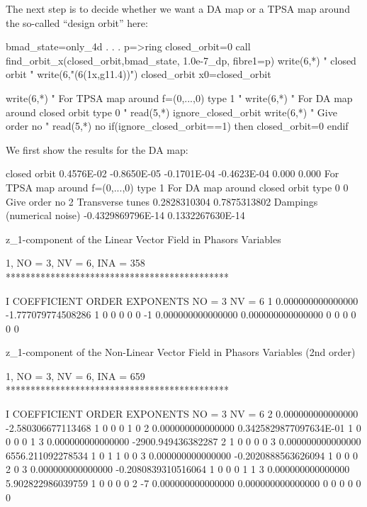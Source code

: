 \documentclass{hitec}     %
\begin{document}
{{{{{{ The next step is to decide whether we want a DA map or a TPSA map around the so-called ``design orbit''  here:
 
 \begin{code}
 bmad_state=only_4d
     .
     .
     .
 p=>ring%
closed_orbit=0
call find_orbit_x(closed_orbit,bmad_state, 1.0e-7_dp, fibre1=p)
write(6,*) " closed orbit "
write(6,"(6(1x,g11.4))") closed_orbit
 x0=closed_orbit

write(6,*) " For TPSA map around f=(0,...,0) type 1 "
write(6,*) " For DA map around closed orbit type 0 "
read(5,*) ignore_closed_orbit 
write(6,*) " Give order no "
read(5,*) no
if(ignore_closed_orbit==1) then
 closed_orbit=0
endif
\end{code}
 
 We first show the results for the DA map:
 
 \renewcommand{\codefont}{\footnotesize}
\begin{code}
  closed orbit
  0.4576E-02 -0.8650E-05 -0.1701E-04 -0.4623E-04   0.000       0.000
  For TPSA map around f=(0,...,0) type 1
  For DA map around closed orbit type 0
0
  Give order no
2
 Transverse tunes
  0.2828310304       0.7875313802
 Dampings (numerical noise)
 -0.4329869796E-14   0.1332267630E-14

z_1-component of the Linear Vector Field in Phasors Variables

          1, NO =    3, NV =    6, INA =  358
 *********************************************

    I  COEFFICIENT          ORDER   EXPONENTS
      NO =     3      NV =     6
   1   0.000000000000000      -1.777079774508286       1  0  0  0  0  0
    -1   0.000000000000000       0.000000000000000       0  0  0  0  0  0

 z_1-component of the Non-Linear Vector Field in Phasors Variables (2nd order)

          1, NO =    3, NV =    6, INA =  659
 *********************************************

    I  COEFFICIENT          ORDER   EXPONENTS
      NO =     3      NV =     6
   2   0.000000000000000      -2.580306677113468       1  0  0  0  1  0
   2   0.000000000000000      0.3425829877097634E-01   1  0  0  0  0  1
   3   0.000000000000000      -2900.949436382287       2  1  0  0  0  0
   3   0.000000000000000       6556.211092278534       1  0  1  1  0  0
   3   0.000000000000000     -0.2020888563626094       1  0  0  0  2  0
   3   0.000000000000000     -0.2080839310516064       1  0  0  0  1  1
   3   0.000000000000000       5.902822986039759       1  0  0  0  0  2
    -7   0.000000000000000       0.000000000000000       0  0  0  0  0  0
\end{code}

}}}}}}
\end{document}
